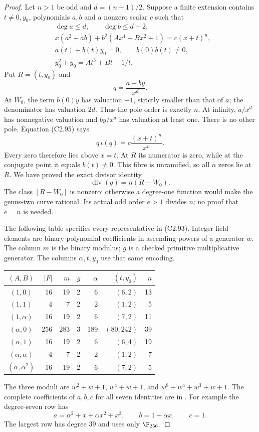 \begin{proof}
Let $n>1$ be odd and $d=(n-1)/2$.
Suppose a finite extension contains
$t\ne0,y_0$, polynomials $a,b$ and a
nonzero scalar $c$ such that
\[
 \begin{aligned}
 &\deg a\le d,\qquad \deg b\le d-2,\\
 &x(a^2+ab)+b^2(Ax^4+Bx^2+1)=c(x+t)^n,\\
 &a(t)+b(t)y_0=0,\qquad b(0)b(t)\ne0,\\
 &y_0^2+y_0=At^3+Bt+1/t.
 \end{aligned}                                             \tag{C2.95}
\]
Put $R=(t,y_0)$ and
\[
                            q=\frac{a+by}{x^d}.
\]
At $W_0$, the term $b(0)y$ has valuation
$-1$, strictly smaller than that of $a$;
the denominator has valuation $2d$.
Thus the pole order is exactly $n$.
At infinity, $a/x^d$ has nonnegative
valuation and $by/x^d$ has valuation at
least one. There is no other pole.
Equation (C2.95) says
\[
                  q\,\iota(q)=c\frac{(x+t)^n}{x^n}.
\]
Every zero therefore lies above $x=t$.
At $R$ its numerator is zero, while at
the conjugate point it equals $b(t)\ne0$.
This fibre is unramified, so all $n$
zeros lie at $R$. We have proved the
exact divisor identity
\[
                      \operatorname{div}(q)=n(R-W_0).      \tag{C2.96}
\]
The class $[R-W_0]$ is nonzero: otherwise
a degree-one function would make the
genus-two curve rational. Its actual odd
order $e>1$ divides $n$; no proof that
$e=n$ is needed.

The following table specifies every
representative in (C2.93). Integer field
elements are binary polynomial coefficients
in ascending powers of a generator $w$.
The column $m$ is the binary modulus;
$g$ is a checked primitive multiplicative
generator. The columns $\alpha,t,y_0$
use that same encoding.
\begin{center}
\begin{tabular}{crrrrrr}
\toprule
$(A,B)$&$|F|$&$m$&$g$&$\alpha$&$(t,y_0)$&$n$\\
\midrule
$(1,0)$&16&19&2&6&$(6,2)$&13\\
$(1,1)$&4&7&2&2&$(1,2)$&5\\
$(1,\alpha)$&16&19&2&6&$(7,2)$&11\\
$(\alpha,0)$&256&283&3&189&$(80,242)$&39\\
$(\alpha,1)$&16&19&2&6&$(6,4)$&19\\
$(\alpha,\alpha)$&4&7&2&2&$(1,2)$&7\\
$(\alpha,\alpha^2)$&16&19&2&6&$(7,2)$&5\\
\bottomrule
\end{tabular}
\end{center}
The three moduli are
$w^2+w+1$, $w^4+w+1$, and
$w^8+w^4+w^3+w+1$.
The complete coefficients of $a,b,c$
for all seven identities are in
.
For example the degree-seven row has
\[
 a=\alpha^2+x+\alpha x^2+x^3,
 \qquad b=1+\alpha x,
 \qquad c=1.
\]
The largest row has degree $39$ and
uses only $\F_{256}$.


\end{proof}
